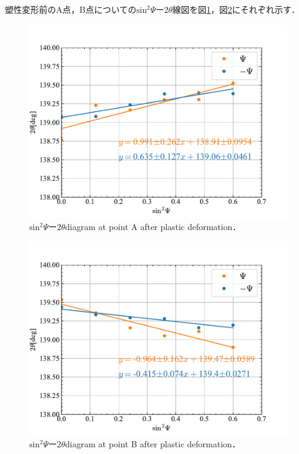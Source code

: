 塑性変形前のA点，B点についての$\mathrm{sin}^2\Psi$ー$2\theta$線図を図\ref{fig:fig_AfterRed}，図\ref{fig:fig_AfterBlack}にそれぞれ示す．
\begin{figure}[htbp]
    \centering %
    \includegraphics[width=100truemm,clip]{fig/fig_AfterRed.pdf}
    \caption{$\mathrm{sin}^2\Psi$ー$2\theta$diagram at point A after plastic deformation．}
    \label{fig:fig_AfterRed}
\end{figure}
\clearpage
\begin{figure}[htbp]
    \centering %
    \includegraphics[width=100truemm,clip]{fig/fig_AfterBlack.pdf}
    \caption{$\mathrm{sin}^2\Psi$ー$2\theta$diagram at point B after plastic deformation．}
    \label{fig:fig_AfterBlack}
\end{figure}

